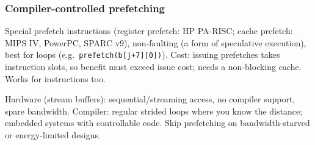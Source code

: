 \subsubsection{Compiler-controlled prefetching}
Special prefetch instructions (register prefetch: HP PA-RISC; cache prefetch: MIPS IV, PowerPC, SPARC v9), non-faulting (a form of speculative execution), best for loops (e.g.\ \texttt{prefetch(b[j+7][0])}). Cost: issuing prefetches takes instruction slots, so benefit must exceed issue cost; needs a non-blocking cache. Works for instructions too.

\begin{dec}
Hardware (stream buffers): sequential/streaming access, no compiler support, spare bandwidth. Compiler: regular strided loops where you know the distance; embedded systems with controllable code. Skip prefetching on bandwidth-starved or energy-limited designs.
\end{dec}

